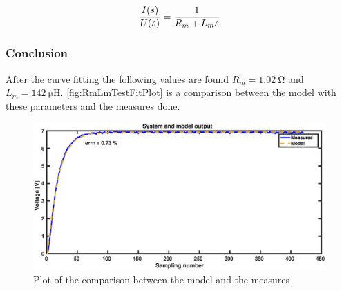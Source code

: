 \begin{equation} \label{eq:RmLmTf}
\frac{I(s)}{U(s)}=\frac{1}{R_m +L_m s} \addunit{1}
\end{equation}

\subsubsection*{Conclusion}

After the curve fitting the following values are found $R_m=\SI{1.02}{\ohm}$ and $L_m=\SI{142}{\micro\henry}$. \autoref{fig:RmLmTestFitPlot} is a comparison between the model with these parameters and the measures done.

\begin{figure}[htbp]
	\centering
	\includegraphics[width=\textwidth]{figures/appendix/Motor&GearTests/RmLmFitPlot}
	\caption{Plot of the comparison between the model and the measures}\label{fig:RmLmTestFitPlot}
\end{figure}
